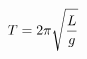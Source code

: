 \documentclass[preview]{standalone}
\begin{document}
\begin{align*}
\special{dvisvgm:raw <g id='unique000'>}T = 2\pi\sqrt{\frac{L}{g}}\special{dvisvgm:raw </g>}
\end{align*}
\end{document}
